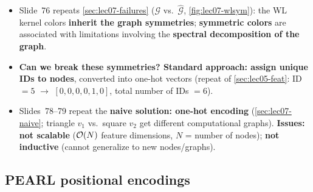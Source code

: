 \begin{itemize}
  \item Slide~76 repeats \cref{sec:lec07-failures} ($\mathcal{G}$ vs.\
    $\hat{\mathcal{G}}$, \cref{fig:lec07-wlsym}): the WL kernel colors
    \textbf{inherit the graph symmetries}; \textbf{symmetric colors} are associated
    with limitations involving the \textbf{spectral decomposition of the graph}.
  \item \textbf{Can we break these symmetries? Standard approach: assign unique
    IDs to nodes}, converted into one-hot vectors (repeat of
    \cref{sec:lec05-feat}: ID $=5$ $\to$ $[0,0,0,0,1,0]$, total number of IDs
    $=6$).
  \item Slides~78--79 repeat the \textbf{naive solution: one-hot encoding}
    (\cref{sec:lec07-naive}; triangle $v_1$ vs.\ square $v_2$ get different
    computational graphs). \textbf{Issues:} \textbf{not scalable} ($\mathcal{O}(N)$
    feature dimensions, $N$ = number of nodes); \textbf{not inductive} (cannot
    generalize to new nodes/graphs).
\end{itemize}

\subsection{PEARL positional encodings}\label{sec:lec08-pearlpe}
\slides{80--87}

